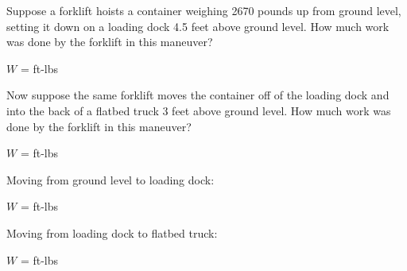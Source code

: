 

Suppose a forklift hoists a container weighing 2670 pounds up from ground level, setting it down on a loading dock 4.5 feet above ground level.  How much work was done by the forklift in this maneuver?

\vskip 10pt

$W$ = \underbar{\hskip 50pt} ft-lbs

\vskip 10pt

Now suppose the same forklift moves the container off of the loading dock and into the back of a flatbed truck 3 feet above ground level.  How much work was done by the forklift in this maneuver?

\vskip 10pt

$W$ = \underbar{\hskip 50pt} ft-lbs







Moving from ground level to loading dock:

$W$ =  ft-lbs

\vskip 10pt

Moving from loading dock to flatbed truck:

$W$ =  ft-lbs











